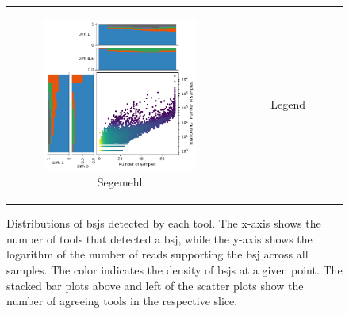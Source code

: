\begin{figure}[ht]
\begin{tabular}{cc}
\begin{subfigure}{.4\textwidth}
            \includegraphics[width=\linewidth]{chapters/4_results_and_discussion/figures/detection/density/segemehl.png}
            \caption{Segemehl}
            \label{fig:detection_density_segemehl}
        \end{subfigure}
         &
        \begin{subfigure}{.4\textwidth}
            \centering
            \caption{Legend}
        \end{subfigure}
    \end{tabular}
    \caption{Distributions of \gls{bsj}s detected by each tool.
        The x-axis shows the number of tools that detected a \gls{bsj}, while the
        y-axis shows the logarithm of the number of reads supporting the \gls{bsj}
        across all samples.
        The color indicates the density of \gls{bsj}s at a given point.
        The stacked bar plots above and left of the scatter plots show the number of
        agreeing tools in the respective slice.
    }
    \label{fig:detection_density}
\end{figure}

\noindent{}


